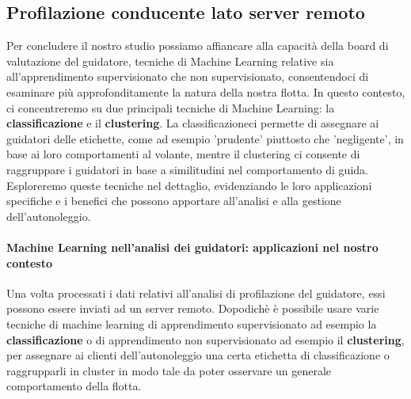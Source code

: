 \documentclass[12pt, a4paper, italian]{report}
\numberwithin{figure}{chapter}
\numberwithin{table}{chapter}
\begin{document}
\subsection{Profilazione conducente lato server remoto} 
Per concludere il nostro studio possiamo affiancare alla capacità della board di valutazione del guidatore, tecniche di Machine Learning relative sia all'apprendimento supervisionato che non supervisionato, consentendoci di esaminare più approfonditamente la natura della nostra flotta. In questo contesto, ci concentreremo su due principali tecniche di Machine Learning: la \textbf{classificazione} e il \textbf{clustering}. La classificazioneci permette di assegnare ai guidatori delle etichette, come ad esempio 'prudente' piuttosto che 'negligente', in base ai loro comportamenti al volante, mentre il clustering ci consente di raggruppare i guidatori in base a similitudini nel comportamento di guida. Esploreremo queste tecniche nel dettaglio, evidenziando le loro applicazioni specifiche e i benefici che possono apportare all'analisi e alla gestione dell'autonoleggio. \cite{wiki:Apprendimento_automatico}

\vspace{0.5cm}
\paragraph{Machine Learning nell'analisi dei guidatori: applicazioni nel nostro contesto}
Una volta processati i dati relativi all'analisi di profilazione del guidatore, essi possono essere inviati ad un server remoto. Dopodichè è possibile usare varie tecniche di machine learning di apprendimento supervisionato ad esempio la \textbf{classificazione} o di apprendimento non supervisionato ad esempio il \textbf{clustering}, per assegnare ai clienti dell'autonoleggio una certa etichetta di classificazione o raggrupparli in cluster in modo tale da poter osservare un generale comportamento della flotta.
\end{document}
